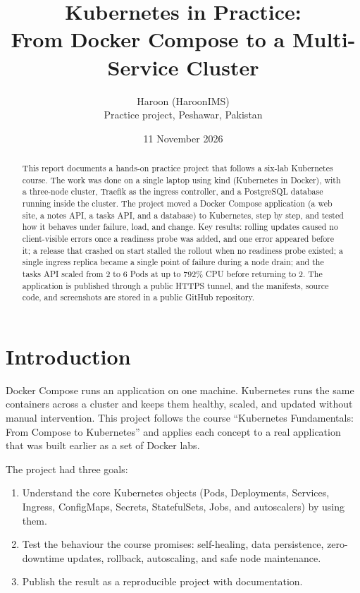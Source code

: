 \documentclass[11pt,a4paper]{article}
\title{\textbf{Kubernetes in Practice:\\ From Docker Compose to a Multi-Service Cluster}}
\author{Haroon (HaroonIMS)\\ Practice project, Peshawar, Pakistan}
\date{11 November 2026}
\begin{document}
\maketitle

\begin{abstract}
This report documents a hands-on practice project that follows a six-lab Kubernetes course. The work was done on a single laptop using kind (Kubernetes in Docker), with a three-node cluster, Traefik as the ingress controller, and a PostgreSQL database running inside the cluster. The project moved a Docker Compose application (a web site, a notes API, a tasks API, and a database) to Kubernetes, step by step, and tested how it behaves under failure, load, and change. Key results: rolling updates caused no client-visible errors once a readiness probe was added, and one error appeared before it; a release that crashed on start stalled the rollout when no readiness probe existed; a single ingress replica became a single point of failure during a node drain; and the tasks API scaled from 2 to 6 Pods at up to 792\% CPU before returning to 2. The application is published through a public HTTPS tunnel, and the manifests, source code, and screenshots are stored in a public GitHub repository.
\end{abstract}

\tableofcontents
\newpage

\section{Introduction}
Docker Compose runs an application on one machine. Kubernetes runs the same containers across a cluster and keeps them healthy, scaled, and updated without manual intervention. This project follows the course ``Kubernetes Fundamentals: From Compose to Kubernetes'' and applies each concept to a real application that was built earlier as a set of Docker labs.

The project had three goals:
\begin{enumerate}[leftmargin=*]
  \item Understand the core Kubernetes objects (Pods, Deployments, Services, Ingress, ConfigMaps, Secrets, StatefulSets, Jobs, and autoscalers) by using them.
  \item Test the behaviour the course promises: self-healing, data persistence, zero-downtime updates, rollback, autoscaling, and safe node maintenance.
  \item Publish the result as a reproducible project with documentation.
\end{enumerate}
\end{document}
